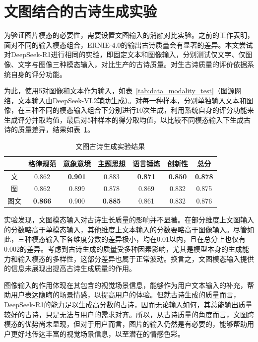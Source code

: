 \section{文图结合的古诗生成实验}

为验证图片模态的必要性，需要设置文图输入的消融对比实验。之前的工作表明，面对不同的输入模态组合，ERNIE-4.0的输出古诗质量会有显著的差异。本文尝试对DeepSeek-R1进行相同的实验，即固定文本和图像输入，分别测试仅文字、仅图像、文字与图像三种模态输入，对比生产的古诗质量。对生古诗质量的评价依据系统自身的评分功能。

为此，使用5对图像和文本作为输入，如表~\ref{tab:data_modality_test}（图源网络，文本输入由DeepSeek-VL2辅助生成）。对每一种样本，分别单独输入文本和图像，在三种不同的模态输入组合下分别进行10次生成，利用系统自身的评分功能来生成评分并取均值，最后对5种样本的得分取均值，以比较不同模态输入下生成古诗的质量差异，结果如表~\ref{tab:test_generation_modal}。

\begin{table}[ht]
  \centering
  \caption{文图古诗生成实验结果}
  \label{tab:test_generation_modal}
  \begin{tabular}{ccccccc}
      \toprule
      & 格律规范&	意象意境&	主题思想&	语言锤炼&	创新性&	总分\\
      \midrule
      文	&	0.862 	&	\bf{0.901} 	&	0.883 	&	\bf{0.871} 	&	\bf{0.850} 	&	\bf{0.878} 	\\
      图	&	0.862 	&	0.899 	&	0.878 	&	0.869 	&	0.832 	&	0.875 	\\
      图文	&	\bf{0.866} 	&	0.900 	&	\bf{0.885} 	&	0.861 	&	0.832 	&	0.876 	\\
      \bottomrule
  \end{tabular}
\end{table}

实验发现，文图模态输入对古诗生长质量的影响并不显著。在部分维度上文图输入的分数略高于单模态输入，其他维度上文本输入的分数要略高于图像输入。尽管如此，三种模态输入下各维度分数的差异极小，均在$0.01$以内，且在总分上也仅有$0.002$的差异。考虑到古诗生成的质量受多种因素影响，尤其是模型本身的生成能力和输入模态的多样性，这部分差异也属于正常波动。换言之，文图模态输入提供的信息未展现出提高古诗生成质量的作用。

图像输入的作用体现在其包含的视觉场景信息，能够作为用户文本输入的补充，帮助用户表达隐晦的场景情感，以提高用户的体验。但就古诗生成的质量而言，DeepSeek-R1的能力足以生成高分数的古诗，因而无论输入如何，其总能输出质量较好的古诗，只是无法与用户的需求对齐。所以，从古诗质量的角度而言，文图跨模态的优势尚未显现，但对于用户而言，图片的输入仍然是有必要的，能够帮助用户更好地传达丰富的视觉场景信息，以至潜在的情感色彩。 

